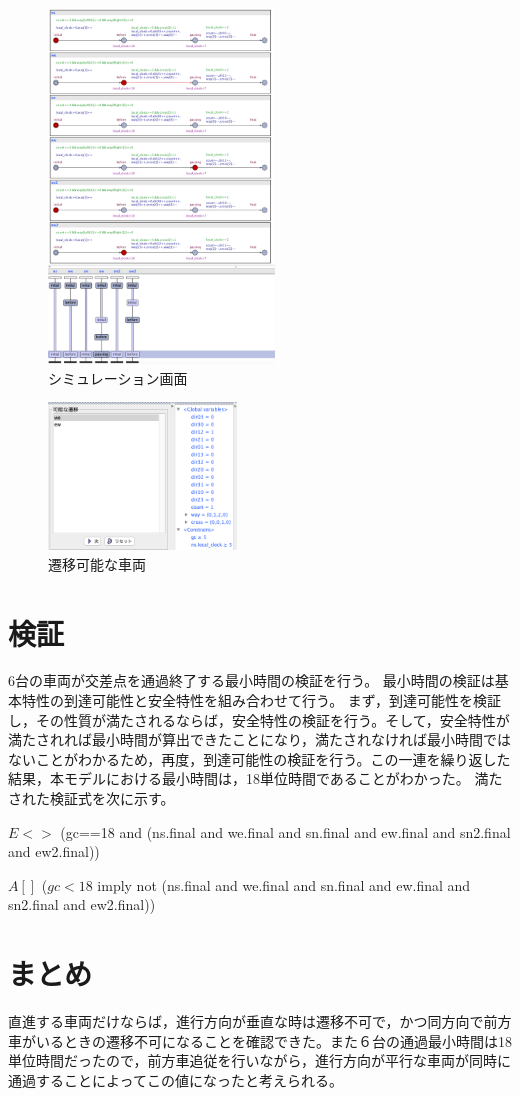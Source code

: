\documentclass[twocolumn,a4paper]{jsarticle}
\begin{document}
\begin{figure}
  \centering
  \includegraphics[width=60mm]{simu.png}
  \caption{シミュレーション画面}
  \label{simu}
\end{figure}
\begin{figure}
  \centering
  \includegraphics[width=50mm]{able.png}
  \caption{遷移可能な車両}
  \label{able}
\end{figure}

\section{検証}
6台の車両が交差点を通過終了する最小時間の検証を行う。
最小時間の検証は基本特性の到達可能性と安全特性を組み合わせて行う。
まず，到達可能性を検証し，その性質が満たされるならば，安全特性の検証を行う。そして，安全特性が満たされれば最小時間が算出できたことになり，満たされなければ最小時間ではないことがわかるため，再度，到達可能性の検証を行う。この一連を繰り返した結果，本モデルにおける最小時間は，18単位時間であることがわかった。
満たされた検証式を次に示す。

$E<>$ (gc==18 and (ns.final and we.final and sn.final and ew.final and sn2.final and ew2.final))



$A[]$ ($gc<18$ imply not (ns.final and we.final and sn.final and ew.final and sn2.final and ew2.final))

\section{まとめ}
直進する車両だけならば，進行方向が垂直な時は遷移不可で，かつ同方向で前方車がいるときの遷移不可になることを確認できた。また６台の通過最小時間は18単位時間だったので，前方車追従を行いながら，進行方向が平行な車両が同時に通過することによってこの値になったと考えられる。
\end{document}
